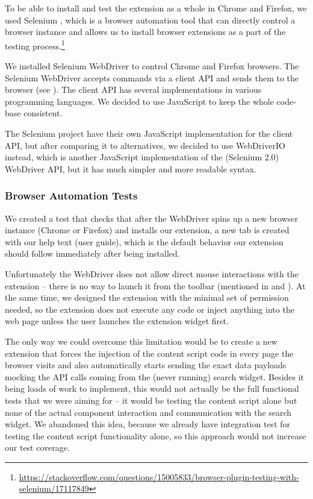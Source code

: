 \documentclass[bsc,frontabs,twoside,singlespacing,parskip,deptreport]{infthesis}
\begin{document}
To be able to install and test the extension as a whole in Chrome and Firefox, we used Selenium \cite{A15}, which is a browser automation tool that can directly control a browser instance and allows us to install browser extensions as a part of the testing process.\footnote{\url{https://stackoverflow.com/questions/15005833/browser-plugin-testing-with-selenium/17117849}}

We installed Selenium WebDriver to control Chrome and Firefox browsers. The Selenium WebDriver accepts commands via a client API and sends them to the browser (see \cite{W2}). The client API has several implementations in various programming languages. We decided to use JavaScript to keep the whole code-base consistent. 

The Selenium project have their own JavaScript implementation for the client API, but after comparing it to alternatives, we decided to use WebDriverIO \cite{A16} instead, which is another JavaScript implementation of the (Selenium 2.0) WebDriver API, but it has much simpler and more readable syntax.

\subsubsection{Browser Automation Tests}
We created a test that checks that after the WebDriver spins up a new browser instance (Chrome or Firefox) and installs our extension, a new tab is created with our help text (user guide), which is the default behavior our extension should follow immediately after being installed.

Unfortunately the WebDriver does not allow direct mouse interactions with the extension -- there is no way to launch it from the toolbar (mentioned in \cite{A17} and \cite{A18}). At the same time, we designed the extension with the minimal set of permission needed, so the extension does not execute any code or inject anything into the web page unless the user launches the extension widget first.

The only way we could overcome this limitation would be to create a new extension that forces the injection of the content script code in every page the browser visits and also automatically starts sending the exact data payloads mocking the API calls coming from the (never running) search widget. Besides it being loads of work to implement, this would not actually be the full functional tests that we were aiming for -- it would be testing the content script alone but none of the actual component interaction and communication with the search widget. We abandoned this idea, because we already have integration test for testing the content script functionality alone, so this approach would not increase our test coverage.
\end{document}
